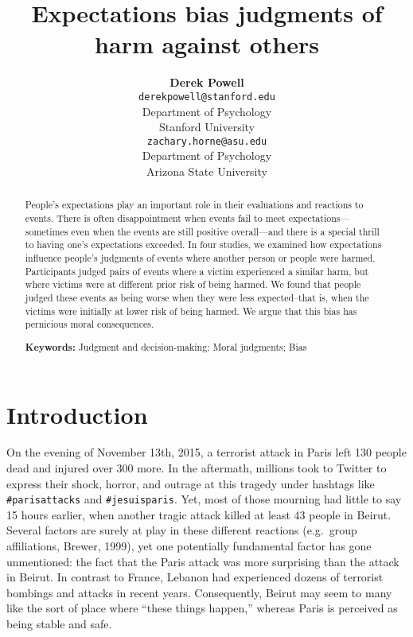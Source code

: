 \documentclass[10pt, letterpaper]{article}
\title{Expectations bias judgments of harm against others}
\author{{\large \bf Derek Powell} \\ \texttt{derekpowell@stanford.edu} \\ Department of Psychology \\ Stanford University \And {\large \bf Zachary Horne} \\ \texttt{zachary.horne@asu.edu} \\ Department of Psychology \\ Arizona State University}
\begin{document}
\maketitle

\begin{abstract}
People's expectations play an important role in their evaluations and
reactions to events. There is often disappointment when events fail to
meet expectations---sometimes even when the events are still positive
overall---and there is a special thrill to having one's expectations
exceeded. In four studies, we examined how expectations influence
people's judgments of events where another person or people were harmed.
Participants judged pairs of events where a victim experienced a similar
harm, but where victims were at different prior risk of being harmed. We
found that people judged these events as being worse when they were less
expected--that is, when the victims were initially at lower risk of
being harmed. We argue that this bias has pernicious moral consequences.

\textbf{Keywords:}
Judgment and decision-making; Moral judgments; Bias
\end{abstract}

\section{Introduction}\label{introduction}

On the evening of November 13th, 2015, a terrorist attack in Paris left
130 people dead and injured over 300 more. In the aftermath, millions
took to Twitter to express their shock, horror, and outrage at this
tragedy under hashtags like \texttt{\#parisattacks} and
\texttt{\#jesuisparis}. Yet, most of those mourning had little to say 15
hours earlier, when another tragic attack killed at least 43 people in
Beirut. Several factors are surely at play in these different reactions
(e.g.~group affiliations, Brewer, 1999), yet one potentially fundamental
factor has gone unmentioned: the fact that the Paris attack was more
surprising than the attack in Beirut. In contrast to France, Lebanon had
experienced dozens of terrorist bombings and attacks in recent years.
Consequently, Beirut may seem to many like the sort of place where
``these things happen,'' whereas Paris is perceived as being stable and
safe.
\end{document}
